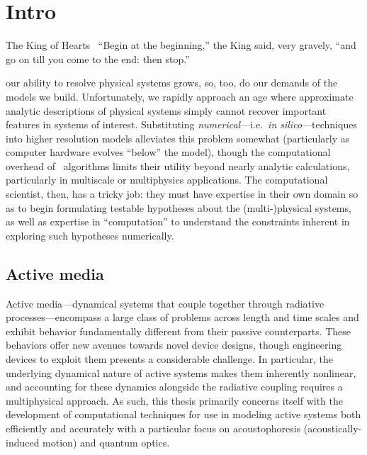 \chapter{\label{ch:intro}Intro}

\begin{frontquote}{The King of Hearts~\cite{wonderland}}
``Begin at the beginning,'' the King said, very gravely, ``and go on till you come to the end: then stop.''
\end{frontquote}

 our ability to resolve physical systems grows, so, too, do our demands of the models we build.
Unfortunately, we rapidly approach an age where approximate analytic descriptions of physical systems simply cannot recover important features in systems of interest.
Substituting \emph{numerical}---i.e.\ \emph{in silico}---techniques into higher resolution models alleviates this problem somewhat (particularly as computer hardware evolves ``below'' the model), though the computational overhead of \naive\ algorithms limits their utility beyond nearly analytic calculations, particularly in multiscale or multiphysics applications.
The computational scientist, then, has a tricky job: they must have expertise in their own domain so as to begin formulating testable hypotheses about the (multi-)physical systems, as well as expertise in ``computation'' to understand the constraints inherent in exploring such hypotheses numerically.

\section{Active media}

Active media---dynamical systems that couple together through radiative processes---encompass a large class of problems across length and time scales and exhibit behavior fundamentally different from their passive counterparts.
These behaviors offer new avenues towards novel device designs, though engineering devices to exploit them presents a considerable challenge.
In particular, the underlying dynamical nature of active systems makes them inherently nonlinear, and accounting for these dynamics alongside the radiative coupling requires a multiphysical approach.
As such, this thesis primarily concerns itself with the development of computational techniques for use in modeling active systems both efficiently and accurately with a particular focus on acoustophoresis (acoustically-induced motion) and quantum optics.

